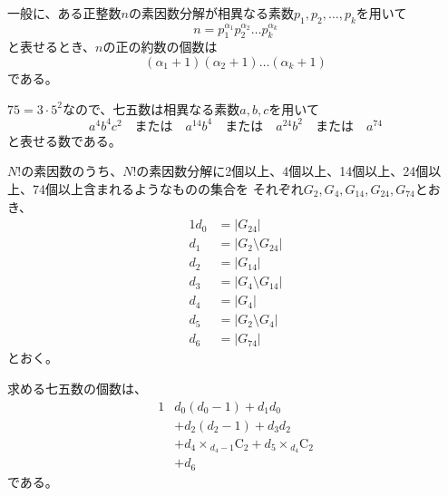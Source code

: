 \documentclass{article}
\newcommand{\combination}[2]{{}_{#1} \mathrm{C}_{#2}}
\begin{document}
一般に、ある正整数$n$の素因数分解が相異なる素数$p_1, p_2, \dots, p_k$を用いて
\begin{equation}
    n = p_1^{\alpha_1} p_2^{\alpha_2} \dots p_k^{\alpha_k}
\end{equation}
と表せるとき、$n$の正の約数の個数は
\begin{equation}
    (\alpha_1 + 1)(\alpha_2 + 1) \dots (\alpha_k + 1)
\end{equation}
である。

$75 = 3 \cdot 5^2$なので、七五数は相異なる素数$a, b, c$を用いて
\begin{equation}
    a^4 b^4 c^2 \quad \mbox{または} \quad a^{14} b^4 \quad \mbox{または} \quad a^{24} b^2
    \quad \mbox{または} \quad a^{74}
\end{equation}
と表せる数である。

$N!$の素因数のうち、$N!$の素因数分解に2個以上、4個以上、14個以上、24個以上、74個以上含まれるようなものの集合を
それぞれ$G_2, G_4, G_{14}, G_{24}, G_{74}$とおき、
\begin{alignat}{1}
    d_0 &= |G_{24}| \\
    d_1 &= |G_2 \setminus G_{24}| \\
    d_2 &= |G_{14}| \\
    d_3 &= |G_4 \setminus G_{14}| \\
    d_4 &= |G_4| \\
    d_5 &= |G_2 \setminus G_4| \\
    d_6 &= |G_{74}|
\end{alignat}
とおく。

求める七五数の個数は、
\begin{alignat}{1}
    &d_0 (d_0 - 1) + d_1 d_0 \\
    &+ d_2 (d_2 - 1) + d_3 d_2 \\
    &+ d_4 \times \combination{d_4 - 1}{2} + d_5 \times \combination{d_4}{2} \\
    &+ d_6
\end{alignat}
である。
\end{document}
